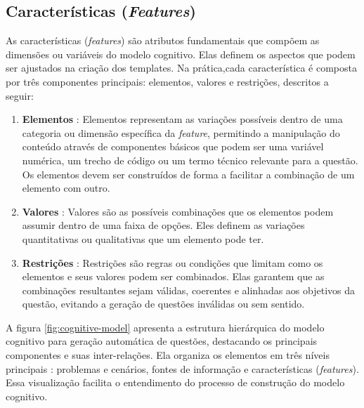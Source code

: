 \subsection{Características (\textit{Features})}

As características (\textit{features}) são atributos fundamentais que compõem as dimensões ou variáveis do modelo cognitivo. Elas definem os aspectos que podem ser ajustados na criação dos templates. Na prática,cada característica é composta por três componentes principais: elementos, valores e restrições, descritos a seguir:

\begin{enumerate}
\item \textbf{Elementos} : Elementos representam as variações possíveis dentro de uma categoria ou dimensão específica da \textit{feature}, permitindo a manipulação do conteúdo através de componentes básicos que podem ser uma variável numérica, um trecho de código ou um termo técnico relevante para a questão. Os elementos devem ser construídos de forma a facilitar a combinação de um elemento com outro.

\item \textbf{Valores} : Valores são as possíveis combinações que os elementos podem assumir dentro de uma faixa de opções. Eles definem as variações quantitativas ou qualitativas que um elemento pode ter.

\item \textbf{Restrições} : Restrições são regras ou condições que limitam como os elementos e seus valores podem ser combinados. Elas garantem que as combinações resultantes sejam válidas, coerentes e alinhadas aos objetivos da questão, evitando a geração de questões inválidas ou sem sentido.

\end{enumerate}


A figura \ref{fig:cognitive-model} apresenta a estrutura hierárquica do modelo cognitivo para geração automática de questões, destacando os principais componentes e suas inter-relações. Ela organiza os elementos em três níveis principais : problemas e cenários, fontes de informação e características (\textit{features}). Essa visualização facilita o entendimento do processo de construção do modelo cognitivo.

